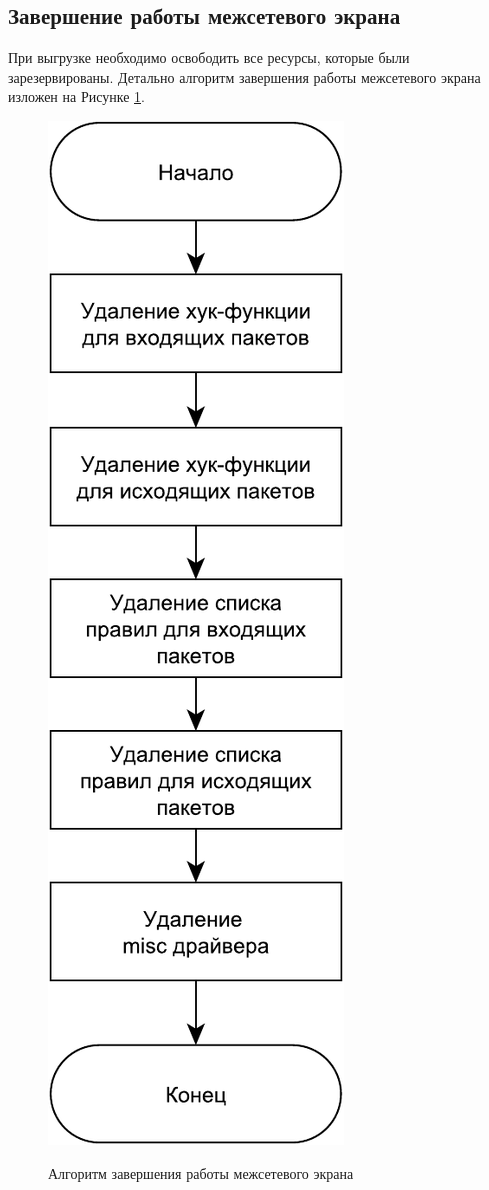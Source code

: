 \newpage

\subsection{Завершение работы межсетевого экрана}
При выгрузке необходимо освободить все ресурсы, которые были зарезервированы. Детально алгоритм завершения работы межсетевого экрана изложен на Рисунке \ref{fig22:image}.
\begin{figure}[h!]
	\begin{center}
		{\includegraphics[scale = 0.6]{img/exit.pdf}}
		\caption{Алгоритм завершения работы межсетевого экрана}
		\label{fig22:image}
	\end{center}
\end{figure}

